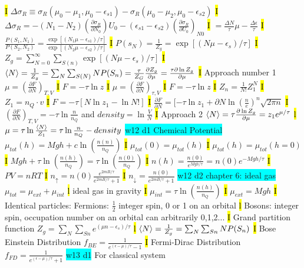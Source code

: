 \documentclass[fontsize=4pt]{scrartcl}
\begin{document}
\hl{I}
$\Delta \sigma_R \equiv \sigma_R(\mu_0 - \mu_1, \mu_0 - \epsilon_{s1}) - \sigma_R(\mu_0 - \mu_2, \mu_0 - \epsilon_{s2})  $
\hl{I}
$\Delta \sigma_R = -(N_1 - N_2)(\frac{\partial \sigma_R}{\partial N_0})U_0 - (\epsilon_{s1} - \epsilon_{s2})(\frac{\partial \sigma_R}{\partial U_0})_{N0}$
\hl{I}
$=\frac{\Delta N}{\tau}\mu - \frac{\Delta \epsilon}{\tau}$
\hl{I}
$\frac{P(S_1,N_1)}{P(S_2,N_2)}=\frac{\exp[(N_1 \mu - \epsilon_{s1}) / \tau]}{\exp[(N_2 \mu - \epsilon_{s2}) / \tau]}$
\hl{I}
$P(s_N) = \frac{1}{Z_g} = \exp[(N\mu - \epsilon_s)/\tau]$
\hl{I}
$Z_g = \sum_{N=0}^{\infty}\sum_{S(n)} \exp[(N\mu - \epsilon_s)/\tau]$
\hl{I}
$\expval{N} = \frac{1}{Z_g} = \sum_{N} \sum_{S(N)} N P(S_n) = \frac{\tau}{Z_G} \frac{\partial Z_g}{\partial \mu} = \frac{\tau \partial \ln Z_g}{\partial \mu}$
\hl{I}
Approach number 1
$\mu = (\frac{\partial F}{\partial N})_{T,V}$
\hl{I}
$F = -\tau \ln z$
\hl{I}
$\mu = (\frac{\partial F}{\partial N})_{\tau,V}$
\hl{I}
$F = -\tau \ln z$
\hl{I}
$Z_n = \frac{1}{N!}Z_1^N$
\hl{I}
$Z_1 = n_Q \cdot v$
\hl{I}
$F = -\tau [N\ln z_1 - \ln N!]$
\hl{I}
$\frac{\partial F}{\partial N} = [-\tau \ln z_1 + \partial N \ln (\frac{n}{e})^{n} \sqrt{2\pi n} $
\hl{I}
$(\frac{\partial F}{\partial N})_{T,V} = -\tau \ln \frac{n}{n_Q}$ and $density=\ln \frac{V}{N}$
\hl{I}
Approach 2 $\expval{N} = \tau \frac{\partial \ln Z_g}{\partial \mu} = z_1 e^{\mu/\tau}$
\hl{l}
$\mu = \tau \ln \frac{\expval{N}}{Z_1} = \tau \ln \frac{n}{n_Q} - density$
\colorbox{Cyan}{w12 d1 Chemical Potential}
$\mu_{tot}(h) = Mgh + c\ln (\frac{n(n)}{n_Q})$
\hl{I}
$\mu_{tot}(0)=\mu_{tot}(h)$
\hl{I}
$\mu_{tot}(h)=\mu_{tot}(h=0)$
\hl{I}
$Mgh + \tau \ln(\frac{n(h)}{n_Q}) = \tau \ln (\frac{n(0)}{n_Q})$
\hl{I}
$n(h) = \frac{n(0)}{e^{Mgh/\tau}}=n(0)e^{-Mgh/\tau}$
\hl{I}
$PV=nRT$
\hl{I}
$n_{\uparrow} = n(0) \frac{e^{2mB/\tau}}{e^{2mB/\tau}+1}$
\hl{I}
$n_{\downarrow} =  \frac{n(0)}{e^{2mB/\tau}+1}$
\colorbox{Cyan}{w12 d2 chapter 6: ideal gas}
$\mu_{tot}=\mu_{ext}+\mu_{int}$
\hl{l}
ideal gas in gravity
\hl{I}
$\mu_{int} = \tau \ln(\frac{n(h)}{n_Q})$
\hl{I}
$\mu_{ext} = Mgh$
\hl{I}
Identical particles: Fermions: $\frac{1}{2}$ integer spin, 0 or 1 on an orbital
\hl{l}
Bosons: integer spin, occupation number on an orbital can arbitrarily 0,1,2...
\hl{I}
Grand partition function $Z_g = \sum_{N} \sum_{Sn} e^{(\mu n - \epsilon_s)/\tau}$
\hl{l}
$\expval{N} = \frac{1}{Z_g} = \sum_{N} \sum_{Sn} N P(S_n)$
\hl{I}
Bose Einstein Distribution $f_{BE} = \frac{1}{e^{(\epsilon - \mu)/\tau} -1}$
\hl{I}
Fermi-Dirac Distribution $f_{FD} = \frac{1}{e^{(\epsilon - \mu)/\tau} +1}$
\colorbox{Cyan}{w13 d1}
For classical system 
\end{document}
